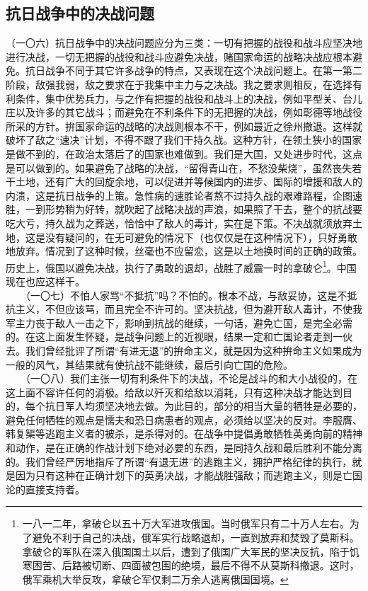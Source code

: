 \documentclass[cn,11pt,chinese]{elegantbook}
\def\myformat#1{\hfil\hfil #1}
\begin{document}
\subsection*{\myformat{抗日战争中的决战问题}}
（一〇六）抗日战争中的决战问题应分为三类：一切有把握的战役和战斗应坚决地进行决战，一切无把握的战役和战斗应避免决战，赌国家命运的战略决战应根本避免。抗日战争不同于其它许多战争的特点，又表现在这个决战问题上。在第一第二阶段，敌强我弱，敌之要求在于我集中主力与之决战。我之要求则相反，在选择有利条件，集中优势兵力，与之作有把握的战役和战斗上的决战，例如平型关、台儿庄以及许多的其它战斗；而避免在不利条件下的无把握的决战，例如彰德等地战役所采的方针。拚国家命运的战略的决战则根本不干，例如最近之徐州撤退。这样就破坏了敌之“速决”计划，不得不跟了我们干持久战。这种方针，在领土狭小的国家是做不到的，在政治太落后了的国家也难做到。我们是大国，又处进步时代，这点是可以做到的。如果避免了战略的决战，“留得青山在，不愁没柴烧”，虽然丧失若干土地，还有广大的回旋余地，可以促进并等候国内的进步、国际的增援和敌人的内溃，这是抗日战争的上策。急性病的速胜论者熬不过持久战的艰难路程，企图速胜，一到形势稍为好转，就吹起了战略决战的声浪，如果照了干去，整个的抗战要吃大亏，持久战为之葬送，恰恰中了敌人的毒计，实在是下策。不决战就须放弃土地，这是没有疑问的，在无可避免的情况下（也仅仅是在这种情况下），只好勇敢地放弃。情况到了这种时候，丝毫也不应留恋，这是以土地换时间的正确的政策。历史上，俄国以避免决战，执行了勇敢的退却，战胜了威震一时的拿破仑\footnote[41]{ 一八一二年，拿破仑以五十万大军进攻俄国。当时俄军只有二十万人左右。为了避免不利于自己的决战，俄军实行战略退却，一直到放弃和焚毁了莫斯科。拿破仑的军队在深入俄国国土以后，遭到了俄国广大军民的坚决反抗，陷于饥寒困苦、后路被切断、四面被包围的绝境，最后不得不从莫斯科撤退。这时，俄军乘机大举反攻，拿破仑军仅剩二万余人逃离俄国国境。}。中国现在也应这样干。\\
　　（一〇七）不怕人家骂“不抵抗”吗？不怕的。根本不战，与敌妥协，这是不抵抗主义，不但应该骂，而且完全不许可的。坚决抗战，但为避开敌人毒计，不使我军主力丧于敌人一击之下，影响到抗战的继续，一句话，避免亡国，是完全必需的。在这上面发生怀疑，是战争问题上的近视眼，结果一定和亡国论者走到一伙去。我们曾经批评了所谓“有进无退”的拚命主义，就是因为这种拚命主义如果成为一般的风气，其结果就有使抗战不能继续，最后引向亡国的危险。\\
　　（一〇八）我们主张一切有利条件下的决战，不论是战斗的和大小战役的，在这上面不容许任何的消极。给敌以歼灭和给敌以消耗，只有这种决战才能达到目的，每个抗日军人均须坚决地去做。为此目的，部分的相当大量的牺牲是必要的，避免任何牺牲的观点是懦夫和恐日病患者的观点，必须给以坚决的反对。李服膺、韩复榘等逃跑主义者的被杀，是杀得对的。在战争中提倡勇敢牺牲英勇向前的精神和动作，是在正确的作战计划下绝对必要的东西，是同持久战和最后胜利不能分离的。我们曾经严厉地指斥了所谓“有退无进”的逃跑主义，拥护严格纪律的执行，就是因为只有这种在正确计划下的英勇决战，才能战胜强敌；而逃跑主义，则是亡国论的直接支持者。\\
\end{document}
